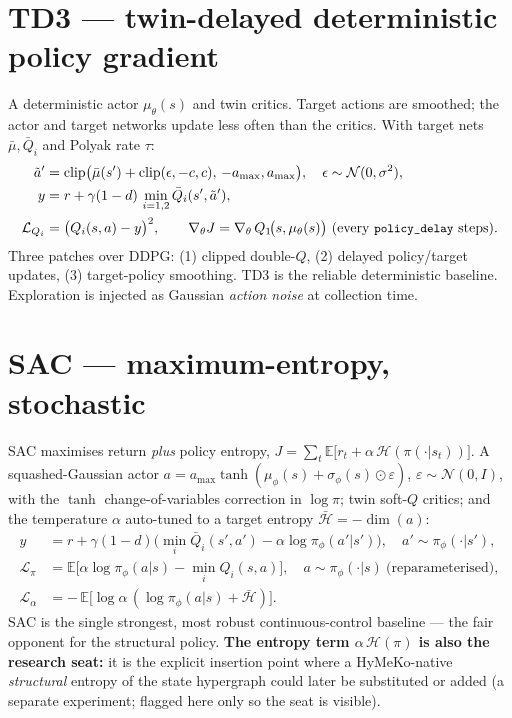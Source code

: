 \documentclass[11pt]{article}
\newcommand{\code}[1]{\texttt{\small #1}}
\begin{document}
\section{TD3 --- twin-delayed deterministic policy gradient}
A deterministic actor $\mu_\theta(s)$ and twin critics. Target actions are smoothed; the actor and target
networks update less often than the critics. With target nets $\bar\mu,\bar Q_i$ and Polyak rate $\tau$:
\begin{align}
  \tilde a' &= \operatorname{clip}\!\big(\bar\mu(s') + \operatorname{clip}(\epsilon,-c,c),\,-a_{\max},a_{\max}\big),
    \quad \epsilon\sim\mathcal N(0,\sigma^2), \\
  y &= r + \gamma(1-d)\,\min_{i=1,2}\bar Q_i(s',\tilde a'), \\
  \mathcal L_{Q_i} &= \big(Q_i(s,a)-y\big)^2, \qquad
  \nabla_\theta J = \nabla_\theta\, Q_1\!\big(s,\mu_\theta(s)\big)\ \text{(every \code{policy\_delay} steps)}.
\end{align}
Three patches over DDPG: (1) clipped double-$Q$, (2) delayed policy/target updates, (3) target-policy
smoothing. TD3 is the reliable deterministic baseline. Exploration is injected as Gaussian \emph{action noise}
at collection time.

\section{SAC --- maximum-entropy, stochastic}
SAC maximises return \emph{plus} policy entropy, $J=\sum_t\mathbb E\big[r_t+\alpha\,\mathcal H(\pi(\cdot|s_t))\big]$.
A squashed-Gaussian actor $a=a_{\max}\tanh(\mu_\phi(s)+\sigma_\phi(s)\odot\varepsilon)$, $\varepsilon\sim\mathcal N(0,I)$,
with the $\tanh$ change-of-variables correction in $\log\pi$; twin soft-$Q$ critics; and the temperature
$\alpha$ auto-tuned to a target entropy $\bar{\mathcal H}=-\dim(a)$:
\begin{align}
  y &= r + \gamma(1-d)\Big(\min_{i}\bar Q_i(s',a') - \alpha\log\pi_\phi(a'|s')\Big), \quad a'\sim\pi_\phi(\cdot|s'),\\
  \mathcal L_\pi &= \mathbb E\big[\alpha\log\pi_\phi(a|s) - \min_i Q_i(s,a)\big], \quad a\sim\pi_\phi(\cdot|s)\ \text{(reparameterised)},\\
  \mathcal L_\alpha &= -\,\mathbb E\big[\log\alpha\,(\log\pi_\phi(a|s)+\bar{\mathcal H})\big].
\end{align}
SAC is the single strongest, most robust continuous-control baseline --- the fair opponent for the structural
policy. \textbf{The entropy term $\alpha\,\mathcal H(\pi)$ is also the research seat:} it is the explicit
insertion point where a HyMeKo-native \emph{structural} entropy of the state hypergraph could later be
substituted or added (a separate experiment; flagged here only so the seat is visible).
\end{document}
